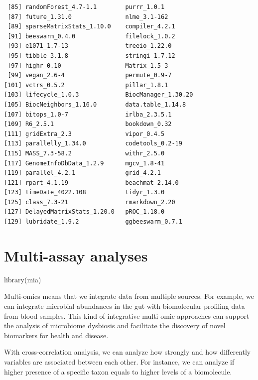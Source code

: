 \documentclass[
]{book}
\newenvironment{Shaded}{\begin{snugshade}}{\end{snugshade}}
\newcommand{\FunctionTok}[1]{\textcolor[rgb]{0.00,0.00,0.00}{#1}}
\newcommand{\NormalTok}[1]{#1}
\begin{document}
\begin{verbatim}
 [85] randomForest_4.7-1.1        purrr_1.0.1                
 [87] future_1.31.0               nlme_3.1-162               
 [89] sparseMatrixStats_1.10.0    compiler_4.2.1             
 [91] beeswarm_0.4.0              filelock_1.0.2             
 [93] e1071_1.7-13                treeio_1.22.0              
 [95] tibble_3.1.8                stringi_1.7.12             
 [97] highr_0.10                  Matrix_1.5-3               
 [99] vegan_2.6-4                 permute_0.9-7              
[101] vctrs_0.5.2                 pillar_1.8.1               
[103] lifecycle_1.0.3             BiocManager_1.30.20        
[105] BiocNeighbors_1.16.0        data.table_1.14.8          
[107] bitops_1.0-7                irlba_2.3.5.1              
[109] R6_2.5.1                    bookdown_0.32              
[111] gridExtra_2.3               vipor_0.4.5                
[113] parallelly_1.34.0           codetools_0.2-19           
[115] MASS_7.3-58.2               withr_2.5.0                
[117] GenomeInfoDbData_1.2.9      mgcv_1.8-41                
[119] parallel_4.2.1              grid_4.2.1                 
[121] rpart_4.1.19                beachmat_2.14.0            
[123] timeDate_4022.108           tidyr_1.3.0                
[125] class_7.3-21                rmarkdown_2.20             
[127] DelayedMatrixStats_1.20.0   pROC_1.18.0                
[129] lubridate_1.9.2             ggbeeswarm_0.7.1           
\end{verbatim}

\hypertarget{multi-assay-analyses}{%
\chapter{Multi-assay analyses}\label{multi-assay-analyses}}

\begin{Shaded}
\begin{Highlighting}[]
\FunctionTok{library}\NormalTok{(mia)}
\end{Highlighting}
\end{Shaded}

Multi-omics means that we integrate data from multiple sources. For
example, we can integrate microbial abundances in the gut with
biomolecular profiling data from blood samples. This kind of
integrative multi-omic approaches can support the analysis of
microbiome dysbiosis and facilitate the discovery of novel biomarkers
for health and disease.

With cross-correlation analysis, we can analyze how strongly and how
differently variables are associated between each other. For instance,
we can analyze if higher presence of a specific taxon equals to higher
levels of a biomolecule.
\end{document}
